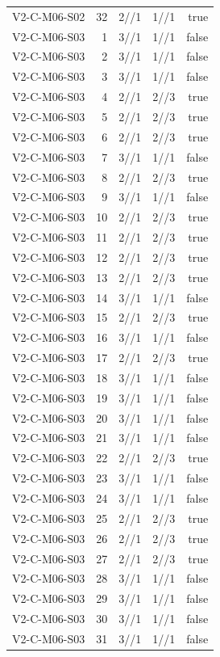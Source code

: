 {\begin{longtable}{lrrrr}
V2-C-M06-S02 & 32 & 2//1 & 1//1 & true \\
V2-C-M06-S03 & 1 & 3//1 & 1//1 & false \\
V2-C-M06-S03 & 2 & 3//1 & 1//1 & false \\
V2-C-M06-S03 & 3 & 3//1 & 1//1 & false \\
V2-C-M06-S03 & 4 & 2//1 & 2//3 & true \\
V2-C-M06-S03 & 5 & 2//1 & 2//3 & true \\
V2-C-M06-S03 & 6 & 2//1 & 2//3 & true \\
V2-C-M06-S03 & 7 & 3//1 & 1//1 & false \\
V2-C-M06-S03 & 8 & 2//1 & 2//3 & true \\
V2-C-M06-S03 & 9 & 3//1 & 1//1 & false \\
V2-C-M06-S03 & 10 & 2//1 & 2//3 & true \\
V2-C-M06-S03 & 11 & 2//1 & 2//3 & true \\
V2-C-M06-S03 & 12 & 2//1 & 2//3 & true \\
V2-C-M06-S03 & 13 & 2//1 & 2//3 & true \\
V2-C-M06-S03 & 14 & 3//1 & 1//1 & false \\
V2-C-M06-S03 & 15 & 2//1 & 2//3 & true \\
V2-C-M06-S03 & 16 & 3//1 & 1//1 & false \\
V2-C-M06-S03 & 17 & 2//1 & 2//3 & true \\
V2-C-M06-S03 & 18 & 3//1 & 1//1 & false \\
V2-C-M06-S03 & 19 & 3//1 & 1//1 & false \\
V2-C-M06-S03 & 20 & 3//1 & 1//1 & false \\
V2-C-M06-S03 & 21 & 3//1 & 1//1 & false \\
V2-C-M06-S03 & 22 & 2//1 & 2//3 & true \\
V2-C-M06-S03 & 23 & 3//1 & 1//1 & false \\
V2-C-M06-S03 & 24 & 3//1 & 1//1 & false \\
V2-C-M06-S03 & 25 & 2//1 & 2//3 & true \\
V2-C-M06-S03 & 26 & 2//1 & 2//3 & true \\
V2-C-M06-S03 & 27 & 2//1 & 2//3 & true \\
V2-C-M06-S03 & 28 & 3//1 & 1//1 & false \\
V2-C-M06-S03 & 29 & 3//1 & 1//1 & false \\
V2-C-M06-S03 & 30 & 3//1 & 1//1 & false \\
V2-C-M06-S03 & 31 & 3//1 & 1//1 & false \\

\end{longtable}}
